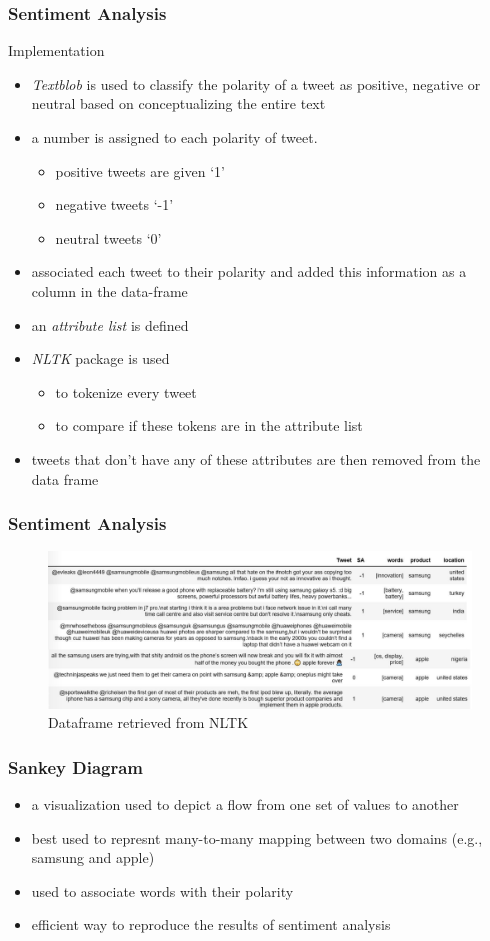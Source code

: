 \documentclass{beamer}
\begin{document}
\begin{frame}
\frametitle{Sentiment Analysis}
{\Large Implementation}
\begin{itemize}
\item  \textit {Textblob} is used to classify the polarity of a tweet as positive, negative or neutral based on conceptualizing the entire text
\item  a number is assigned to each polarity of tweet.
\begin{itemize}
\item positive tweets are given ‘1’
\item negative tweets ‘-1’
\item neutral tweets ‘0’
\end{itemize}
\item associated each tweet to their polarity and added this information as a column in the data-frame
\item an \textit {attribute list}  is defined
\item  \textit {NLTK} package is used
\begin{itemize}
\item to tokenize every tweet
\item to compare if these tokens are in the attribute list
\end{itemize}
\item tweets that don’t have any of these attributes are then removed from the data frame
\end{itemize}
\end{frame}

\begin{frame}
\frametitle{Sentiment Analysis}
\begin{figure}
\includegraphics[scale=0.35]{sentiment}
\caption{ Dataframe retrieved from NLTK}
\end{figure}
\end{frame}

\begin{frame}
\frametitle{Sankey Diagram}
\begin{itemize}
\item   a visualization used to depict a flow from one set of values to another
\item best used  to represnt many-to-many mapping between two domains (e.g., samsung and apple)
\item used to associate words with their polarity
\item efficient way to reproduce the results of sentiment analysis
\end{itemize}
\end{frame}
\end{document}
